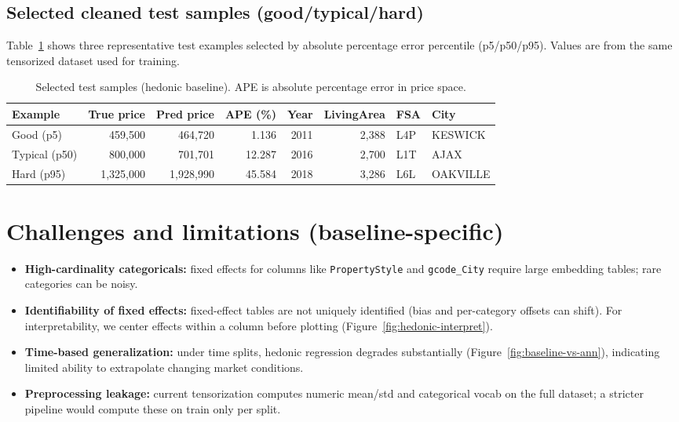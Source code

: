 \documentclass[11pt]{article}
\begin{document}
\subsection{Selected cleaned test samples (good/typical/hard)}
Table~\ref{tab:hedonic-examples} shows three representative test examples selected by absolute percentage error percentile (p5/p50/p95). Values are from the same tensorized dataset used for training.

\begin{table}[h]
\centering
\small
\begin{tabularx}{\linewidth}{@{}lrrrrrll@{}}
\toprule
Example & True price & Pred price & APE (\%) & Year & LivingArea & FSA & City \\
\midrule
Good (p5) & 459{,}500 & 464{,}720 & 1.136 & 2011 & 2{,}388 & L4P & KESWICK \\
Typical (p50) & 800{,}000 & 701{,}701 & 12.287 & 2016 & 2{,}700 & L1T & AJAX \\
Hard (p95) & 1{,}325{,}000 & 1{,}928{,}990 & 45.584 & 2018 & 3{,}286 & L6L & OAKVILLE \\
\bottomrule
\end{tabularx}
\caption{Selected test samples (hedonic baseline). APE is absolute percentage error in price space.}
\label{tab:hedonic-examples}
\end{table}

\section{Challenges and limitations (baseline-specific)}
\begin{itemize}[leftmargin=*]
  \item \textbf{High-cardinality categoricals:} fixed effects for columns like \texttt{PropertyStyle} and \texttt{gcode\_City} require large embedding tables; rare categories can be noisy.
  \item \textbf{Identifiability of fixed effects:} fixed-effect tables are not uniquely identified (bias and per-category offsets can shift). For interpretability, we center effects within a column before plotting (Figure~\ref{fig:hedonic-interpret}).
  \item \textbf{Time-based generalization:} under time splits, hedonic regression degrades substantially (Figure~\ref{fig:baseline-vs-ann}), indicating limited ability to extrapolate changing market conditions.
  \item \textbf{Preprocessing leakage:} current tensorization computes numeric mean/std and categorical vocab on the full dataset; a stricter pipeline would compute these on train only per split.
\end{itemize}
\end{document}
